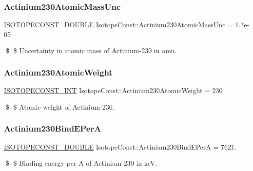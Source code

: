 \subsubsection{\texorpdfstring{Actinium230\+Atomic\+Mass\+Unc}{Actinium230AtomicMassUnc}}
{\footnotesize\ttfamily \mbox{\hyperlink{group___isotope_const-_macros_ga8f45a7272ce02c0b4c65c44636ed719a}{I\+S\+O\+T\+O\+P\+E\+C\+O\+N\+S\+T\+\_\+\+D\+O\+U\+B\+LE}} Isotope\+Const\+::\+Actinium230\+Atomic\+Mass\+Unc = 1.\+7e-\/05}

\$ \$ Uncertainty in atomic mass of Actinium-\/230 in amu. \mbox{\label{group___isotope_const-_actinium-_ac230_gacefb88f3a58e2f4603ffd24207326359}} 
\subsubsection{\texorpdfstring{Actinium230\+Atomic\+Weight}{Actinium230AtomicWeight}}
{\footnotesize\ttfamily \mbox{\hyperlink{group___isotope_const-_macros_ga5f18360b3e99483a35c32d789e62621c}{I\+S\+O\+T\+O\+P\+E\+C\+O\+N\+S\+T\+\_\+\+I\+NT}} Isotope\+Const\+::\+Actinium230\+Atomic\+Weight = 230}

\$ \$ Atomic weight of Actinium-\/230. \mbox{\label{group___isotope_const-_actinium-_ac230_ga4f3af793f8a938413f5f82b5574f2afd}} 
\subsubsection{\texorpdfstring{Actinium230\+Bind\+E\+PerA}{Actinium230BindEPerA}}
{\footnotesize\ttfamily \mbox{\hyperlink{group___isotope_const-_macros_ga8f45a7272ce02c0b4c65c44636ed719a}{I\+S\+O\+T\+O\+P\+E\+C\+O\+N\+S\+T\+\_\+\+D\+O\+U\+B\+LE}} Isotope\+Const\+::\+Actinium230\+Bind\+E\+PerA = 7621.}

\$ \$ Binding energy per A of Actinium-\/230 in keV. \mbox{\label{group___isotope_const-_actinium-_ac230_ga230064d3941d1e378128f727a6e49661}} 
